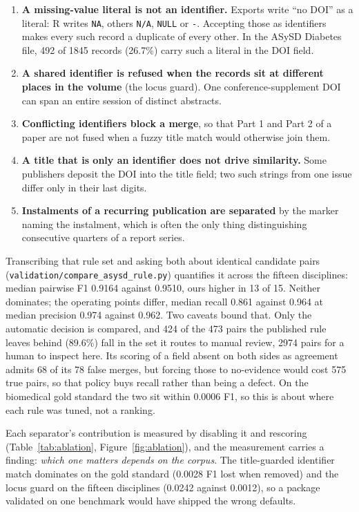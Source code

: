 \documentclass[final,5p,times,twocolumn]{elsarticle}
\begin{document}
\begin{enumerate}
\item \textbf{A missing-value literal is not an identifier.} Exports write
  ``no DOI'' as a literal: R writes \texttt{NA}, others \texttt{N/A},
  \texttt{NULL} or \texttt{-}. Accepting those as identifiers makes every such
  record a duplicate of every other. In the ASySD Diabetes file, 492 of 1845
  records (26.7\%) carry such a literal in the DOI field.
\item \textbf{A shared identifier is refused when the records sit at different
  places in the volume} (the locus guard). One conference-supplement DOI can
  span an entire session of distinct abstracts.
\item \textbf{Conflicting identifiers block a merge}, so that Part 1 and
  Part 2 of a paper are not fused when a fuzzy title match would otherwise
  join them.
\item \textbf{A title that is only an identifier does not drive similarity.}
  Some publishers deposit the DOI into the title field; two such strings from
  one issue differ only in their last digits.
\item \textbf{Instalments of a recurring publication are separated} by the
  marker naming the instalment, which is often the only thing distinguishing
  consecutive quarters of a report series.
\end{enumerate}

Transcribing that rule set and asking both about identical candidate pairs
(\texttt{validation/compare\_asysd\_rule.py}) quantifies it across the
fifteen disciplines: median pairwise F1 0.9164 against 0.9510, ours higher
in 13 of 15. Neither dominates; the operating points differ, median recall
0.861 against 0.964 at median precision 0.974 against 0.962. Two caveats bound
that. Only the automatic decision is compared, and 424 of the 473 pairs the
published rule leaves behind (89.6\%) fall in the set it routes to manual
review, 2974 pairs for a human to inspect here. Its scoring of a field absent
on both sides as agreement admits 68 of its 78 false merges, but forcing those
to no-evidence would cost 575 true pairs, so that policy buys recall rather
than being a defect. On the biomedical gold standard the two sit within 0.0006
F1, so this is about where each rule was tuned, not a ranking.

Each separator's contribution is measured by disabling it and rescoring
(Table~\ref{tab:ablation}, Figure~\ref{fig:ablation}), and the measurement
carries a finding: \emph{which one matters depends on the corpus}. The
title-guarded identifier match dominates on the gold standard (0.0028 F1 lost
when removed) and the locus guard on the fifteen disciplines (0.0242 against
0.0012), so a package validated on one benchmark would have shipped the wrong
defaults.
\end{document}
